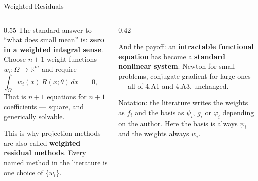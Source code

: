 \begin{frame}{Weighted Residuals}
\begin{columns}[T]
\begin{column}{0.55\textwidth}
\small
The standard answer to ``what does small mean'' is: \textbf{zero in a weighted integral sense}. Choose $n+1$ weight functions $w_i:\Omega\to\mathbb{R}^{m}$ and require
\[
  \int_{\Omega} w_i(x)\,R(x;\theta)\,dx \;=\; 0,
  \qquad i=0,\dots,n .
\]
That is $n+1$ equations for $n+1$ coefficients --- square, and generically solvable.
\medskip

This is why projection methods are also called \textbf{weighted residual methods}. Every named method in the literature is one choice of $\{w_i\}$.
\end{column}
\begin{column}{0.42\textwidth}
\begin{takeawaybox}\footnotesize
And the payoff: an \textbf{intractable functional equation} has become a \textbf{standard nonlinear system}. Newton for small problems, conjugate gradient for large ones --- all of 4.A1 and 4.A3, unchanged.
\end{takeawaybox}
\medskip
\begin{examplebox}\footnotesize
Notation: the literature writes the weights as $f_i$ and the basis as $\psi_i$, $g_i$ or $\varphi_i$ depending on the author. Here the basis is always $\psi_i$ and the weights always $w_i$.
\end{examplebox}
\end{column}
\end{columns}
\vspace{1mm}
\end{frame}

